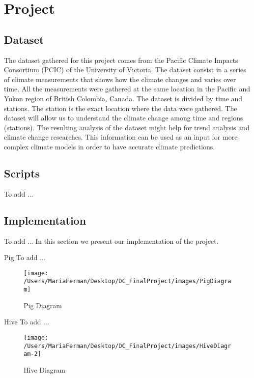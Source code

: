 
\section{Project}
\label{sec:Project}




\subsection{ Dataset}
The dataset gathered for this project comes from the Pacific Climate Impacts Consortium (PCIC) of the University of Victoria. The dataset consist in a series of climate measurements that shows how the climate changes and varies over time. All the measurements were gathered at the same location in the Pacific and Yukon region of British Colombia, Canada.
The dataset is divided by time and stations. The station is the exact location where the data were gathered. 
The dataset will allow us to understand the climate change among time and regions (stations). The resulting analysis of the dataset might help for trend analysis and climate change researches. This information can be used as an input for more complex climate models in order to have accurate climate predictions.

\subsection{Scripts}
To add ...

\subsection{Implementation}
To add ...
In this section we present our implementation of the project.  

Pig To add ...
\begin{figure}[h!]
	\begin{center}
		\texttt{[image: /Users/MariaFerman/Desktop/DC\_FinalProject/images/PigDiagram]}
		\caption{Pig Diagram}
		\label{fig:dataDiagr}
	\end{center}
	\vspace{-10pt}
\end{figure}

Hive To add ...
\begin{figure}[h!]
	\begin{center}
		\texttt{[image: /Users/MariaFerman/Desktop/DC\_FinalProject/images/HiveDiagram-2]}
		\caption{Hive Diagram}
		\label{fig:dataDiagr}
	\end{center}
	\vspace{-10pt}
\end{figure}


